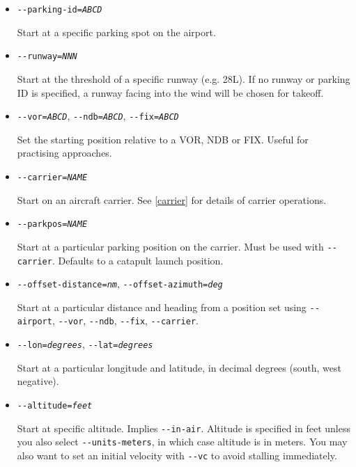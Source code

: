 \begin{itemize}
{\begin{itemize}
  \item{\texttt{-$ $-parking-id={\it ABCD}}}

  Start at a specific parking spot on the airport.

  \item{\texttt{-$ $-runway={\it NNN}}}

  Start at the threshold of a specific runway (e.g. 28L). If no runway or parking ID is
  specified, a runway facing into the wind will be chosen for takeoff.

  \item{\texttt{-$ $-vor={\it ABCD}}, \texttt{-$ $-ndb={\it ABCD}}, \texttt{-$ $-fix={\it ABCD}}}

  Set the starting position relative to a VOR, NDB or FIX. Useful for practising approaches.

  \item{\texttt{-$ $-carrier={\it NAME}}}

  Start on an aircraft carrier. See \ref{carrier} for details of carrier operations.

  \item{\texttt{-$ $-parkpos={\it NAME}}}

  Start at a particular parking position on the carrier. Must be used with \texttt{-$ $-carrier}.
  Defaults to a catapult launch position.

  \item{\texttt{-$ $-offset-distance={\it nm}}, \texttt{-$ $-offset-azimuth={\it deg}}}

  Start at a particular distance and heading from a position set using \texttt{-$ $-airport},
  \texttt{-$ $-vor}, \texttt{-$ $-ndb}, \texttt{-$ $-fix}, \texttt{-$ $-carrier}.

  \item{\texttt{-$ $-lon={\it degrees}}, \texttt{-$ $-lat={\it degrees}}}

  Start at a particular longitude and latitude, in decimal degrees (south, west negative).

  \item{\texttt{-$ $-altitude={\it feet}}}

  Start at specific altitude. Implies \texttt{-$ $-in-air}. Altitude is specified in feet unless you
  also select \texttt{-$ $-units-meters}, in which case altitude is in meters. You may also want to set
  an initial velocity with \texttt{-$ $-vc} to avoid stalling immediately.


\end{itemize}}
\end{itemize}
